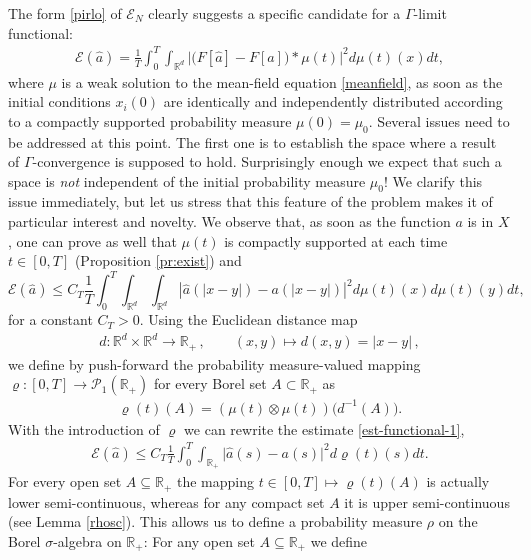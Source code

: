 \documentclass[A4paper,11pt]{article}
\theoremstyle{definition}
\newcommand{\R}{\mathbb{R}}
\begin{document}
The form \eqref{pirlo} of $\mathcal E_N$ clearly suggests a specific candidate for a $\Gamma$-limit functional:
\begin{align}\label{ourfunctional}
	\mathcal E(\widehat a)=\frac{1}{T}\int_0^T \int_{\R^d} \biggl|\bigl(F[\widehat a]-F[a]\bigr)\ast\mu(t)\biggr|^2d\mu(t)(x)dt,
\end{align}
where $\mu$ is a weak solution to the mean-field equation \eqref{meanfield}, as soon as the initial conditions $x_i(0)$ are identically and independently 
distributed according to a compactly supported probability measure $\mu(0)=\mu_0$. Several issues  need to be addressed at this point.
The first one is to establish the space where a result of $\Gamma$-convergence is supposed to hold. Surprisingly enough we expect that
such a space is {\it not} independent of the initial probability measure $\mu_0$! We clarify this issue immediately, but let us stress that this feature of the problem
makes it of particular interest and novelty. We observe that, as soon as the function $a$ is in $X$, one can prove as well that
$\mu(t)$ is compactly supported at each time $t \in [0,T]$ (Proposition \ref{pr:exist}) and
\begin{equation}\label{est-functional-1}
\mathcal E(\widehat a) \leq C_T \frac{1}{T}\int_0^T  \int_{\R^d} \int_{\R^d}  | \widehat a(| x-y|) - a(| x-y|)|^2 d \mu(t)(x) d \mu(t)(y) dt,
\end{equation}
for a constant $C_T>0$.
Using the Euclidean distance map
\begin{align*}
	d:\R^d\times\R^d\rightarrow\R_+\,,\qquad (x,y)\mapsto d(x,y)=|x-y|\,,
\end{align*}
we define by push-forward the probability measure-valued mapping $\varrho:[0,T]\rightarrow \mathcal{P}_1(\R_+)$  for every Borel set $A\subset\R_+$ as
\begin{align*}
	\varrho(t)(A)=(\mu(t)\otimes\mu(t))\bigl(d^{-1}(A)\bigr).
\end{align*}
With the introduction of $\varrho$ we can rewrite the estimate \eqref{est-functional-1},
\begin{align}\label{midpoint1}
	\mathcal E(\widehat a)\leq C_T \frac{1}{T}  \int_0^T\int_{\R_+}\bigl|\widehat a(s)-a(s)\bigr|^2 d\varrho(t)(s) dt.
\end{align}
For every open set $A\subseteq\R_+$ the mapping $t \in [0,T] \mapsto\varrho(t)(A)$ is actually lower semi-continuous, whereas for
	any compact set $A$ it is upper semi-continuous (see Lemma \ref{rhosc}).
This allows us to define a probability measure $\rho$ on the Borel $\sigma$-algebra on $\R_+$: For any open set $A \subseteq \R_+$ we define
\end{document}

